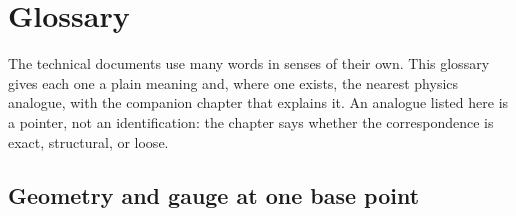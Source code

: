 \chapter*{Glossary}
\label{comp:glossary}

The technical documents use many words in senses of their own. This glossary gives each one a plain
meaning and, where one exists, the nearest physics analogue, with the companion chapter that explains
it. An analogue listed here is a pointer, not an identification: the chapter says whether the
correspondence is exact, structural, or loose.

\section*{Geometry and gauge at one base point}

